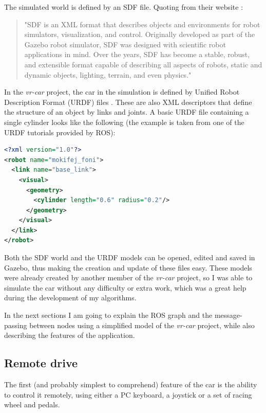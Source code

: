 The simulated world is defined by an SDF file. Quoting from their website \cite{sdf}:

\begin{quote}
"SDF is an XML format that describes objects and environments for robot simulators, visualization, and control. Originally developed as part of the Gazebo robot simulator, SDF was designed with scientific robot applications in mind. Over the years, SDF has become a stable, robust, and extensible format capable of describing all aspects of robots, static and dynamic objects, lighting, terrain, and even physics."
\end{quote}

In the \textit{vr-car} project, the car in the simulation is defined by Unified Robot Description Format (URDF) files \cite{ros_urdf}. These are also XML descriptors that define the structure of an object by links and joints. A basic URDF file containing a single cylinder looks like the following (the example is taken from one of the URDF tutorials \cite{ros_urdf_tutorials} provided by ROS):

\begin{minipage}{\textwidth}
\begin{lstlisting}[language=XML]
<?xml version="1.0"?>
<robot name="mokifej_foni">
  <link name="base_link">
    <visual>
      <geometry>
        <cylinder length="0.6" radius="0.2"/>
      </geometry>
    </visual>
  </link>
</robot>
\end{lstlisting}
\end{minipage}

Both the SDF world and the URDF models can be opened, edited and saved in Gazebo, thus making the creation and update of these files easy. These models were already created by another member of the \textit{vr-car} project, so I was able to simulate the car without any difficulty or extra work, which was a great help during the development of my algorithms.

In the next sections I am going to explain the ROS graph and the message-passing between nodes using a simplified model of the \textit{vr-car} project, while also describing the features of the application.

\subsection{Remote drive}
The first (and probably simplest to comprehend) feature of the car is the ability to control it remotely, using either a PC keyboard, a joystick or a set of racing wheel and pedals.

